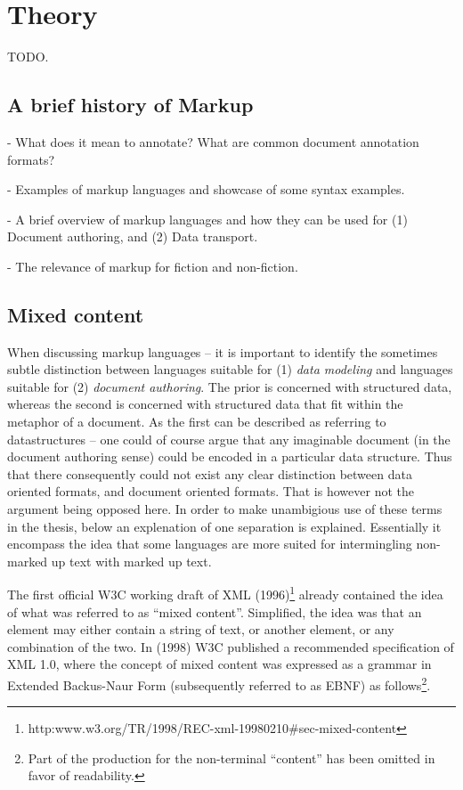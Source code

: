 \documentclass{scrreprt}
\begin{document}
%
%
%
%
%
%


\chapter{Theory}
TODO.



\section{A brief history of Markup}

- What does it mean to annotate? What are common document annotation formats?

- Examples of markup languages and showcase of some syntax examples.

- A brief overview of markup languages and how they can be used for (1) Document authoring, and (2) Data transport.

- The relevance of markup for fiction and non-fiction.



\section{Mixed content}
When discussing markup languages -- it is important to identify the sometimes subtle distinction between languages suitable for (1) \emph{data modeling} and languages suitable for (2) \emph{document authoring}. The prior is concerned with structured data, whereas the second is concerned with structured data that fit within the metaphor  of a document. As the first can be described as referring to datastructures -- one could of course argue that any imaginable document (in the document authoring sense) could be encoded in a particular data structure. Thus that there consequently could not exist any clear distinction between data oriented formats, and document oriented formats. That is however not the argument being opposed here. In order to make unambigious use of these terms in the thesis, below an explenation of one separation is explained. Essentially it encompass the idea that some languages are more suited for intermingling non-marked up text with marked up text.


The first official W3C working draft of XML (1996)\footnote{http:\/\/www.w3.org/TR/1998/REC-xml-19980210\#sec-mixed-content} already contained the idea of what was referred to as ``mixed content''. Simplified, the idea was that an element may either contain a string of text, or another element, or any combination of the two. In (1998) W3C published a recommended specification of XML 1.0, where the concept of mixed content was expressed as a grammar in Extended Backus-Naur Form (subsequently referred to as EBNF) as follows\footnote{Part of the production for the non-terminal ``content'' has been omitted in favor of readability.}.
\end{document}
